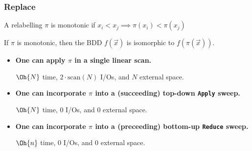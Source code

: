 \documentclass[english, aspectratio=169]{beamer}
\newcommand{\scan}[1]{\text{scan}(#1)}
\begin{document}
\begin{frame}
  \frametitle{Replace}

  \begin{definition}
    A relabelling $\pi$ is monotonic if $x_i < x_j \implies \pi(x_i) < \pi(x_j)$
  \end{definition}

  \begin{lemma}
    If $\pi$ is monotonic, then the BDD $f(\vec{x})$ is isomorphic to $f(\pi(\vec{x}))$.
  \end{lemma}

  \medskip

  \begin{itemize}
  \item<2-> {\bf One can apply $\pi$ in a single linear scan.}

    $\Oh{N}$ time, $2 \cdot \scan{N}$ I/Os, and $N$ external space.

  \item<3-> {\bf One can incorporate $\pi$ into a (succeeding) top-down \texttt{Apply} sweep.}

    $\Oh{N}$ time, $0$ I/Os, and $0$ external space.

  \item<3-> {\bf One can incorporate $\pi$ into a (preceeding) bottom-up \texttt{Reduce} sweep.}

    $\Oh{n}$ time, $0$ I/Os, and $0$ external space.
  \end{itemize}
\end{frame}
\end{document}
